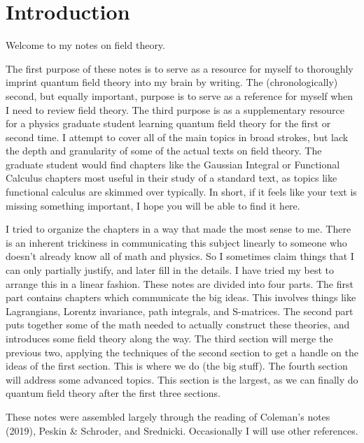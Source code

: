 \documentclass[main.tex]{subfiles}
\begin{document}
\chapter*{Introduction}
Welcome to my notes on field theory.

The first purpose of these notes is to serve as a resource for myself to thoroughly imprint quantum field theory into my brain by writing. The (chronologically) second, but equally important, purpose is to serve as a reference for myself when I need to review field theory. The third purpose is as a supplementary resource for a physics graduate student learning quantum field theory for the first or second time. I attempt to cover all of the main topics in broad strokes, but lack the depth and granularity of some of the actual texts on field theory. The graduate student would find chapters like the Gaussian Integral or Functional Calculus chapters most useful in their study of a standard text, as topics like functional calculus are skimmed over typically. In short, if it feels like your text is missing something important, I hope you will be able to find it here.

I tried to organize the chapters in a way that made the most sense to me. There is an inherent trickiness in communicating this subject linearly to someone who doesn't already know all of math and physics. So I sometimes claim things that I can only partially justify, and later fill in the details. I have tried my best to arrange this in a linear fashion. These notes are divided into four parts. The first part contains chapters which communicate the big ideas. This involves things like Lagrangians, Lorentz invariance, path integrals, and S-matrices. The second part puts together some of the math needed to actually construct these theories, and introduces  some field theory along the way. The third section will merge the previous two, applying the techniques of the second section to get a handle on the ideas of the first section. This is where we do (the big stuff). The fourth section will address some advanced topics. This section is the largest, as we can finally do quantum field theory after the first three sections.

These notes were assembled largely through the reading of Coleman's notes (2019), Peskin \& Schroder, and Srednicki. Occasionally I will use other references.
\end{document}
